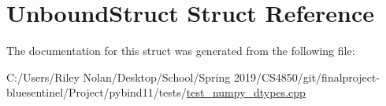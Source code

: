 \hypertarget{struct_unbound_struct}{}\section{Unbound\+Struct Struct Reference}
\label{struct_unbound_struct}


The documentation for this struct was generated from the following file\+:\begin{DoxyCompactItemize}
\item 
C\+:/\+Users/\+Riley Nolan/\+Desktop/\+School/\+Spring 2019/\+C\+S4850/git/finalproject-\/bluesentinel/\+Project/pybind11/tests/\mbox{\hyperlink{test__numpy__dtypes_8cpp}{test\+\_\+numpy\+\_\+dtypes.\+cpp}}\end{DoxyCompactItemize}
